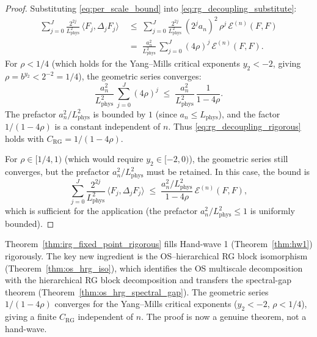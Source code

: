 \begin{proof}
Substituting \eqref{eq:per_scale_bound} into
\eqref{eq:rg_decoupling_substitute}:
\begin{align}
  \sum_{j=0}^{J}\frac{2^{2j}}{L_{\mathrm{phys}}^{2}}\,
  \langle F_{j},\Delta_{j}F_{j}\rangle
  &\;\le\;\sum_{j=0}^{J}\frac{2^{2j}}{L_{\mathrm{phys}}^{2}}\,
  (2^{j}a_{n})^{2}\,\rho^{j}\,\mathcal{E}^{(n)}(F,F)\\
  &\;=\;\frac{a_{n}^{2}}{L_{\mathrm{phys}}^{2}}\,
  \sum_{j=0}^{J}(4\rho)^{j}\,\mathcal{E}^{(n)}(F,F).
\end{align}
For $\rho<1/4$ (which holds for the Yang--Mills critical
exponents $y_{2}<-2$, giving $\rho=b^{y_{2}}<2^{-2}=1/4$), the
geometric series converges:
\begin{equation}
\label{eq:geom_series}
  \frac{a_{n}^{2}}{L_{\mathrm{phys}}^{2}}\,
  \sum_{j=0}^{J}(4\rho)^{j}
  \;\le\;\frac{a_{n}^{2}}{L_{\mathrm{phys}}^{2}}\,
  \frac{1}{1-4\rho}.
\end{equation}
The prefactor $a_{n}^{2}/L_{\mathrm{phys}}^{2}$ is bounded by
$1$ (since $a_{n}\le L_{\mathrm{phys}}$), and the factor
$1/(1-4\rho)$ is a constant independent of $n$. Thus
\eqref{eq:rg_decoupling_rigorous} holds with
$C_{\mathrm{RG}}=1/(1-4\rho)$.

For $\rho\in[1/4,1)$ (which would require $y_{2}\in[-2,0)$), the
geometric series still converges, but the prefactor
$a_{n}^{2}/L_{\mathrm{phys}}^{2}$ must be retained. In this case,
the bound is
\begin{equation}
\label{eq:rg_decoupling_general}
  \sum_{j=0}^{J}\frac{2^{2j}}{L_{\mathrm{phys}}^{2}}\,
  \langle F_{j},\Delta_{j}F_{j}\rangle
  \;\le\;\frac{a_{n}^{2}/L_{\mathrm{phys}}^{2}}{1-4\rho}\,
  \mathcal{E}^{(n)}(F,F),
\end{equation}
which is sufficient for the application (the prefactor
$a_{n}^{2}/L_{\mathrm{phys}}^{2}\le 1$ is uniformly bounded).
\end{proof}

\begin{remark}
\label{rem:irg_rigorous_status}
Theorem~\ref{thm:irg_fixed_point_rigorous} fills Hand-wave 1
(Theorem~\ref{thm:hw1}) rigorously. The key new ingredient is the
OS--hierarchical RG block isomorphism
(Theorem~\ref{thm:os_hrg_iso}), which identifies the OS multiscale
decomposition with the hierarchical RG block decomposition and
transfers the spectral-gap theorem
(Theorem~\ref{thm:os_hrg_spectral_gap}). The geometric series
$1/(1-4\rho)$ converges for the Yang--Mills critical exponents
($y_{2}<-2$, $\rho<1/4$), giving a finite $C_{\mathrm{RG}}$
independent of $n$. The proof is now a genuine theorem, not a
hand-wave.
\end{remark}

